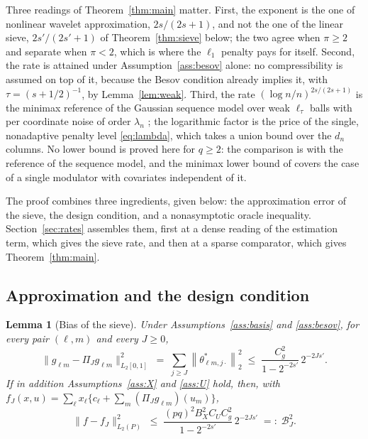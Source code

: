 \documentclass[12pt]{article} %
\newtheorem{lemma}{Lemma}
\theoremstyle{definition}
\newcommand{\norm}[1]{\left\lVert #1 \right\rVert}
\newcommand{\cv}{\ell}
\newcommand{\md}{m}
\newcommand{\lev}{j}
\newcommand{\lvl}[1]{c_{#1}}
\newcommand{\gcomp}[2]{g_{#1#2}}
\newcommand{\PiJ}{\Pi_{J}}
\newcommand{\penn}{\lambda_{n}}
\newcommand{\seff}{s'}
\begin{document}
Three readings of Theorem~\ref{thm:main} matter. First, the exponent is the
one of nonlinear wavelet approximation, $2s/(2s+1)$, and not the one of the
linear sieve, $2\seff/(2\seff+1)$ of Theorem~\ref{thm:sieve} below; the two
agree when $\pi \ge 2$ and separate when $\pi < 2$, which is where the
$\ell_1$ penalty pays for itself. Second, the rate is attained under
Assumption~\ref{ass:besov} alone: no compressibility is assumed on top of it,
because the Besov condition already implies it, with
$\tau = (s+1/2)^{-1}$, by Lemma~\ref{lem:weak}. Third, the rate
$(\log n/n)^{2s/(2s+1)}$ is the minimax reference of the Gaussian sequence
model over weak $\ell_\tau$ balls with per coordinate noise of order $\penn$
\citep{Donoho-Johnstone-1998}; the logarithmic factor is the price of the
single, nonadaptive penalty level \eqref{eq:lambda}, which takes a union bound
over the $d_n$ columns. No lower bound is proved here for $q \ge 2$: the
comparison is with the reference of the sequence model, and the minimax lower
bound of \citet{Klopp-Pensky-2015} covers the case of a single modulator with
covariates independent of it.

The proof combines three ingredients, given below: the approximation error of
the sieve, the design condition, and a nonasymptotic oracle inequality.
Section~\ref{sec:rates} assembles them, first at a dense reading of the
estimation term, which gives the sieve rate, and then at a sparse comparator,
which gives Theorem~\ref{thm:main}.

\subsection{Approximation and the design condition}
\label{sec:approx}

\begin{lemma}[Bias of the sieve]
\label{lem:bias}
Under Assumptions~\ref{ass:basis} and \ref{ass:besov}, for every pair
$(\cv,\md)$ and every $J \ge 0$,
\[
  \bigl\lVert \gcomp{\cv}{\md} - \PiJ\gcomp{\cv}{\md}
  \bigr\rVert_{L_2[0,1]}^{2}
  \;=\; \sum_{\lev \ge J}\norm{\theta^{*}_{\cv\md,\lev\cdot}}_{2}^{2}
  \;\le\; \frac{C_g^{2}}{1-2^{-2\seff}}\,2^{-2J\seff} .
\]
If in addition Assumptions~\ref{ass:X} and \ref{ass:U} hold, then, with
$f_J(x,u) = \sum_{\cv}x_{\cv}\{\lvl{\cv} +
\sum_{\md}(\PiJ\gcomp{\cv}{\md})(u_{\md})\}$,
\begin{equation}
  \label{eq:bias}
  \bigl\lVert f - f_J\bigr\rVert_{L_2(P)}^{2} \;\le\;
  \frac{(pq)^{2}B_X^{2}C_UC_g^{2}}{1-2^{-2\seff}}\,2^{-2J\seff}
  \;=:\; \mathcal{B}_{J}^{2} .
\end{equation}
\end{lemma}
\end{document}
